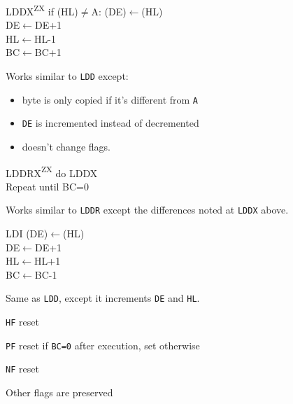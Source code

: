 \documentclass[twoside,openright,a4paper]{book}
\newcommand{\ZXN}{\textnormal{\textsuperscript{ZX}}}
\begin{document}
\begin{basedescript}{
	\desclabelstyle{\multilinelabel}
	\desclabelwidth{3cm}}
	\begin{detailitem}{LDDX\ZXN}
		{if (HL)$\neq$A: (DE)$\leftarrow$(HL)\\
		DE$\leftarrow$DE+1\\
		HL$\leftarrow$HL-1\\
		BC$\leftarrow$BC+1}

		Works similar to {\tt LDD} except:
		\begin{itemize}
			\item byte is only copied if it's different from {\tt A}
			\item {\tt DE} is incremented instead of decremented
			\item doesn't change flags.
		\end{itemize}

		\DetailNoEffect
				
		\begin{DetailTiming}
		\end{DetailTiming}

	\end{detailitem}

	\begin{detailitem}{LDDRX\ZXN}
		{do LDDX\\
		Repeat until BC=0}

		Works similar to {\tt LDDR} except the differences noted at {\tt LDDX} above.

		\DetailNoEffect
					
		\begin{DetailTiming}
			\DetailTime{BC=0}{4}{16}
			\DetailTime{BC$\not=$0}{5}{21}
		\end{DetailTiming}

	\end{detailitem}

	\begin{detailitem}{LDI}
		{(DE)$\leftarrow$(HL)\\
		DE$\leftarrow$DE+1\\
		HL$\leftarrow$HL+1\\
		BC$\leftarrow$BC-1}

		Same as {\tt LDD}, except it increments {\tt DE} and {\tt HL}.

		\begin{DetailEffects}
			\item {\tt HF} reset
			\item {\tt PF} reset if {\tt BC=0} after execution, set otherwise
			\item {\tt NF} reset
			\item Other flags are preserved
		\end{DetailEffects}
				

\end{detailitem}
\end{basedescript}
\end{document}
